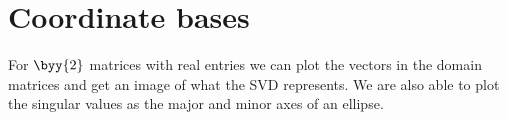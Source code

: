 \chapter{Coordinate bases}
For $\byy{2}$ matrices with real entries we can plot the vectors in the domain matrices and get an image of what the SVD represents. We are also able to plot the singular values as the major and minor axes of an ellipse.






\endinput